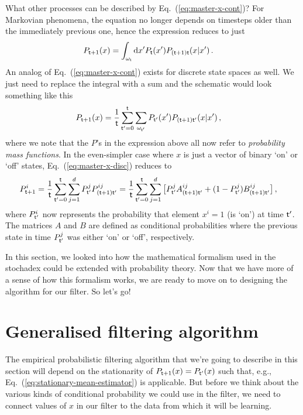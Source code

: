 What other processes can be described by Eq.~(\ref{eq:master-x-cont})? For Markovian phenomena, the equation no longer depends on timesteps older than the immediately previous one, hence the expression reduces to just
\begin{align}
P_{{\sf t}+1}(x) &= \int_{\omega_{\sf t}}{\rm d}x' P_{\sf t}(x') P_{({\sf t}+1){\sf t}}(x\vert x') \label{eq:master-x-cont-markov} \,.
\end{align}
An analog of Eq.~(\ref{eq:master-x-cont}) exists for discrete state spaces as well. We just need to replace the integral with a sum and the schematic would look something like this
\begin{align}
P_{{\sf t}+1}(x) &= \frac{1}{{\sf t}}\sum_{{\sf t}'=0}^{\sf t}\sum_{\omega_{{\sf t}'}} P_{{\sf t}'}(x') P_{({\sf t}+1){\sf t}'}(x \vert x') \label{eq:master-x-disc} \,,
\end{align}
where we note that the $P$'s in the expression above all now refer to \emph{probability mass functions}. In the even-simpler case where $x$ is just a vector of binary `on' or `off' states, Eq.~(\ref{eq:master-x-disc}) reduces to
\begin{align}
P^i_{{\sf t}+1} &= \frac{1}{{\sf t}}\sum_{{\sf t}'=0}^{\sf t} \sum_{j=1}^d P^j_{{\sf t}'} P^{ij}_{({\sf t}+1){\sf t}'} = \frac{1}{{\sf t}}\sum_{{\sf t}'=0}^{\sf t} \sum_{j=1}^d \big[ P^j_{{\sf t}'} A^{ij}_{({\sf t}+1){\sf t}'} + (1-P^j_{{\sf t}'}) B^{ij}_{({\sf t}+1){\sf t}'} \big] \label{eq:master-x-disc-binary}\,,
\end{align}
where $P^i_{{\sf t}'}$ now represents the probability that element $x^i=1$ (is `on') at time ${\sf t}'$. The matrices $A$ and $B$ are defined as conditional probabilities where the previous state in time $P^j_{{\sf t}'}$ was either `on' or `off', respectively.

In this section, we looked into how the mathematical formalism used in the stochadex could be extended with probability theory. Now that we have more of a sense of how this formalism works, we are ready to move on to designing the algorithm for our filter. So let's go!

\section{\sffamily Generalised filtering algorithm}

The empirical probabilistic filtering algorithm that we're going to describe in this section will depend on the stationarity of $P_{{\sf t}+1}(x)=P_{{\sf t}'}(x)$ such that, e.g., Eq.~(\ref{eq:stationary-mean-estimator}) is applicable. But before we think about the various kinds of conditional probability we could use in the filter, we need to connect values of $x$ in our filter to the data from which it will be learning. 

